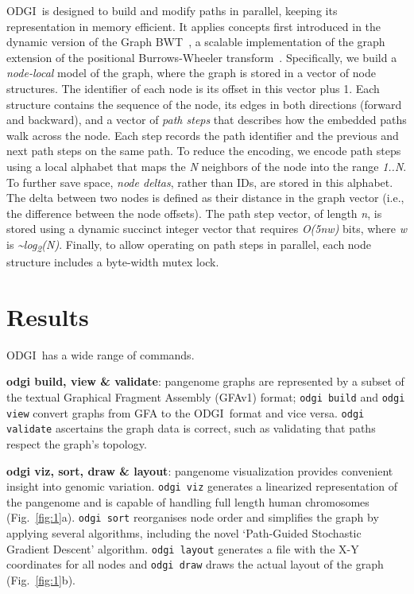 \documentclass{bioinfo}
\newcommand{\odgi}{ODGI}
\newcommand{\cmd}[1]{{\texttt{#1}}}
\newcommand{\cmdbf}[1]{{\textbf{#1}}}
\newcommand{\topic}[1]{{\cmdbf{#1}}:}
\begin{document}
    \odgi\ is designed to build and modify paths in parallel, keeping its representation in memory efficient. It
    applies concepts first introduced in the dynamic version of the Graph BWT~\citep{31406990}, a scalable
    implementation of the graph extension of the positional Burrows-Wheeler transform~\citep{28702075}. Specifically,
    we build a \textit{node-local} model of the graph, where the graph is stored in a vector of node structures.
    The identifier of each node is its offset in this vector plus 1. Each structure contains the sequence of the
    node, its edges in both directions (forward and backward), and a vector of \textit{path steps} that describes
    how the embedded paths walk across the node. Each step records the path identifier and the previous and next
    path steps on the same path. To reduce the encoding, we encode path steps using a local alphabet that maps the
    \textit{N} neighbors of the node into the range \textit{1..N}. To further save space, \textit{node deltas},
    rather than IDs, are stored in this alphabet. The delta between two nodes is defined as their distance in the
    graph vector (i.e., the difference between the node offsets). The path step vector, of length \textit{n}, is
    stored using a dynamic succinct integer vector that requires \textit{O(5nw)} bits, where \textit{w} is
    \textit{\textasciitilde log\textsubscript{2}(N)}. Finally, to allow operating on path steps in parallel, each node
    structure includes a byte-width mutex lock.


    \section{Results}

    \odgi\ has a wide range of commands.

    \topic{odgi build, view \& validate} pangenome graphs are
    represented by a subset of the textual Graphical Fragment Assembly
    (GFAv1) format\citep{GFAv1}; \cmd{odgi build} and \cmd{odgi view}
    convert graphs from GFA to the \odgi\ format and vice versa.
    \cmd{odgi validate} ascertains the graph data is correct, such as
    validating that paths respect the graph's topology.

    \topic{odgi viz, sort, draw \& layout} pangenome visualization
    provides convenient insight into genomic variation. \cmd{odgi viz}
    generates a linearized representation of the pangenome and is
    capable of handling full length human chromosomes
    (Fig.~\ref{fig:1}a). \cmd{odgi sort} reorganises node order and
    simplifies the graph by applying several algorithms, including the
    novel `Path-Guided Stochastic Gradient Descent' algorithm.
    \cmd{odgi layout} generates a file with the X-Y coordinates for
    all nodes and \cmd{odgi draw} draws the actual layout of the graph
    (Fig.~\ref{fig:1}b).
\end{document}
